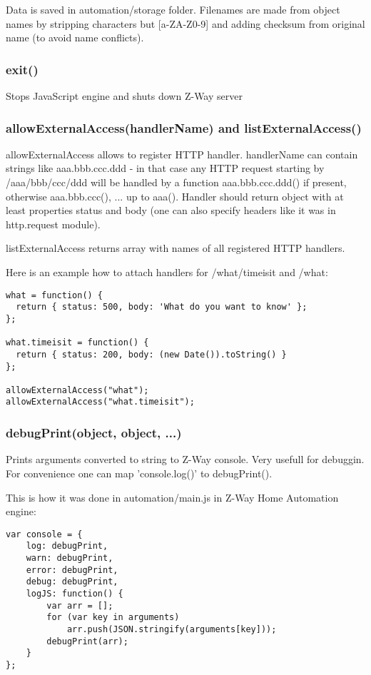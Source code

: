 Data is saved in automation/storage folder. Filenames are made from object names by stripping characters but [a-ZA-Z0-9] and adding checksum from original name (to avoid name conflicts).

\subsubsection{exit()}
Stops JavaScript engine and shuts down Z-Way server


\subsubsection{allowExternalAccess(handlerName) and listExternalAccess()}
allowExternalAccess allows to register HTTP handler. handlerName can contain strings like aaa.bbb.ccc.ddd - in that case any HTTP request starting by /aaa/bbb/ccc/ddd will be handled by a function aaa.bbb.ccc.ddd() if present, otherwise aaa.bbb.ccc(), ... up to aaa().
Handler should return object with at least properties status and body (one can also specify headers like it was in http.request module).

listExternalAccess returns array with names of all registered HTTP handlers.

Here is an example how to attach handlers for /what/timeisit and /what:

\begin{lstlisting}
what = function() {
  return { status: 500, body: 'What do you want to know' };
};

what.timeisit = function() {
  return { status: 200, body: (new Date()).toString() }
};

allowExternalAccess("what");
allowExternalAccess("what.timeisit");
\end{lstlisting}

\subsubsection{debugPrint(object, object, ...)}

Prints arguments converted to string to Z-Way console. Very usefull for debuggin.
For convenience one can map 'console.log()' to debugPrint().

This is how it was done in automation/main.js in Z-Way Home Automation engine:
\begin{lstlisting}
var console = {
    log: debugPrint,
    warn: debugPrint,
    error: debugPrint,
    debug: debugPrint,
    logJS: function() {
        var arr = [];
        for (var key in arguments)
            arr.push(JSON.stringify(arguments[key]));
        debugPrint(arr);
    }
};
\end{lstlisting}

